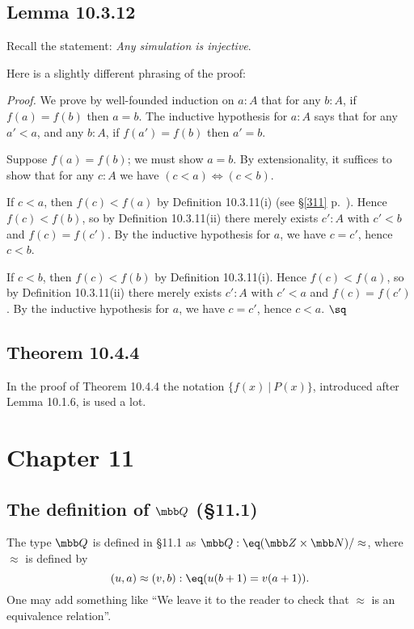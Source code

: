 \documentclass[12pt]{article}
\begin{document}
\subsection{Lemma 10.3.12}

Recall the statement: \emph{Any simulation is injective}.

Here is a slightly different phrasing of the proof:

\nn\emph{Proof.} We prove by well-founded induction on $a:A$ that for any $b:A$, if $f(a)=f(b)$ then $a=b$. The inductive hypothesis for $a:A$ says that for any $a'<a$, and any $b:A$, if $f(a')=f(b)$ then $a'=b$.

Suppose $f(a)=f(b)$; we must show $a=b$. By extensionality, it suffices to show that for any $c:A$ we have $(c<a)\Leftrightarrow(c<b)$. 

If $c<a$, then $f(c)<f(a)$ by Definition 10.3.11(i) (see \S\ref{311} p.~\pageref{311}). Hence $f(c)<f(b)$, so by Definition 10.3.11(ii) there merely exists $c':A$ with $c'<b$ and $f(c)=f(c')$. By the inductive hypothesis for $a$, we have $c=c'$, hence $c<b$. 

If $c<b$, then $f(c)<f(b)$ by Definition 10.3.11(i). Hence $f(c)<f(a)$, so by Definition 10.3.11(ii) there merely exists $c':A$ with $c'<a$ and $f(c)=f(c')$. By the inductive hypothesis for $a$, we have $c=c'$, hence $c<a$. $\sq$


\subsection{Theorem 10.4.4}

In the proof of Theorem 10.4.4 the notation $\{f(x)\ \vert\ P(x)\}$, introduced after Lemma 10.1.6, is used a lot.


\section{Chapter 11}

\subsection[The definition of \tb Q (\S11.1)]{The definition of $\mbb Q$ (\S11.1)}

The type $\mbb Q$ is defined in \S11.1 as $\mbb Q:\eq(\mbb Z\times\mbb N)/\approx$, where $\approx$ is defined by 
$$
(u,a)\approx(v,b):\eq(u(b+1)=v(a+1)).
$$ 
One may add something like ``We leave it to the reader to check that $\approx$ is an equivalence relation''.
\end{document}
